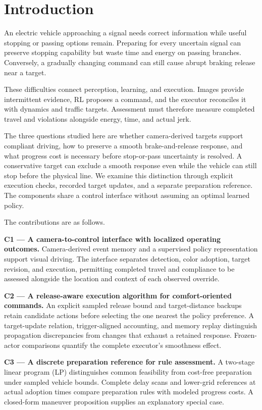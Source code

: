 \documentclass[letterpaper,journal]{IEEEtran}
\begin{document}
\section{Introduction}

An electric vehicle approaching a signal needs correct information while useful stopping or passing options remain. Preparing for every uncertain signal can preserve stopping capability but waste time and energy on passing branches. Conversely, a gradually changing command can still cause abrupt braking release near a target.

These difficulties connect perception, learning, and execution. Images provide intermittent evidence, RL proposes a command, and the executor reconciles it with dynamics and traffic targets. Assessment must therefore measure completed travel and violations alongside energy, time, and actual jerk.

The three questions studied here are whether camera-derived targets support compliant driving, how to preserve a smooth brake-and-release response, and what progress cost is necessary before stop-or-pass uncertainty is resolved. A conservative target can exclude a smooth response even while the vehicle can still stop before the physical line. We examine this distinction through explicit execution checks, recorded target updates, and a separate preparation reference. The components share a control interface without assuming an optimal learned policy.

The contributions are as follows.

\textbf{C1 --- A camera-to-control interface with localized operating outcomes.} Camera-derived event memory and a supervised policy representation support visual driving. The interface separates detection, color adoption, target revision, and execution, permitting completed travel and compliance to be assessed alongside the location and context of each observed override.

\textbf{C2 --- A release-aware execution algorithm for comfort-oriented commands.} An explicit sampled release bound and target-distance backups retain candidate actions before selecting the one nearest the policy preference. A target-update relation, trigger-aligned accounting, and memory replay distinguish propagation discrepancies from changes that exhaust a retained response. Frozen-actor comparisons quantify the complete executor's smoothness effect.

\textbf{C3 --- A discrete preparation reference for rule assessment.} A two-stage linear program (LP) distinguishes common feasibility from cost-free preparation under sampled vehicle bounds. Complete delay scans and lower-grid references at actual adoption times compare preparation rules with modeled progress costs. A closed-form maneuver proposition supplies an explanatory special case.
\end{document}

